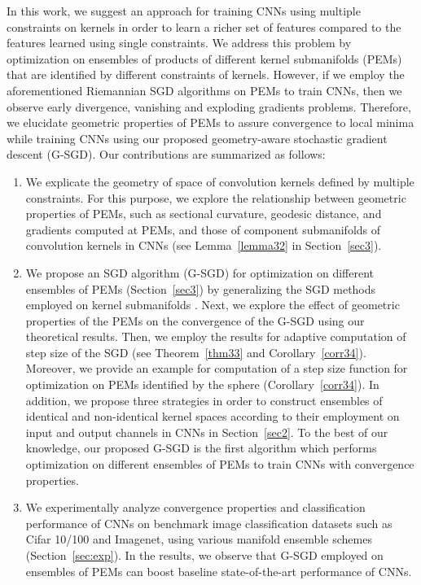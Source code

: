 \documentclass[10pt,journal,compsoc]{IEEEtran}
\theoremstyle{definition}
\theoremstyle{definition}
\theoremstyle{remark}
\theoremstyle{remark}
\theoremstyle{remark}
\begin{document}
	 
	

In this work, we suggest an approach for training CNNs using multiple constraints on kernels in order to learn a richer set of features compared to the features learned using single constraints. We address this problem by optimization on ensembles of products of different kernel submanifolds (PEMs) that are identified by different constraints of kernels. However, if we employ the aforementioned Riemannian SGD algorithms \cite{sgdman,RBN,oo16} on PEMs to train CNNs, then we observe early divergence, vanishing and exploding gradients problems. Therefore, we elucidate geometric properties of PEMs to assure convergence to local minima while training CNNs using our proposed geometry-aware stochastic gradient descent (G-SGD). Our contributions are summarized as follows:
\begin{enumerate}

\item We explicate the geometry of space of convolution kernels defined by multiple constraints. For this purpose, we explore the relationship between geometric properties of PEMs, such as sectional curvature, geodesic distance, and gradients computed at PEMs, and those of component submanifolds of convolution kernels in CNNs (see Lemma~\ref{lemma32} in Section~\ref{sec3}).  

\item We propose an SGD algorithm (G-SGD) for optimization on different ensembles of PEMs (Section~\ref{sec3}) by generalizing the SGD methods employed on kernel submanifolds \cite{haaai,huang162,oo16}. Next, we explore the effect of geometric properties of the PEMs on the convergence of the G-SGD using our theoretical results. Then, we employ the results for adaptive computation of step size of the SGD (see Theorem~\ref{thm33} and Corollary~\ref{corr34}). Moreover, we provide an example for computation of a step size function for optimization on PEMs identified by the sphere (Corollary~\ref{corr34}). In addition, we propose three strategies in order to construct ensembles of identical and non-identical kernel spaces according to their employment on input and output channels in CNNs in Section~\ref{sec2}. To the best of our knowledge, our proposed G-SGD is the first algorithm which performs optimization on different ensembles of PEMs to train CNNs with convergence properties.


\item We experimentally analyze convergence properties and classification performance of CNNs on benchmark image classification datasets such as Cifar 10/100 and Imagenet, using various manifold ensemble schemes (Section~\ref{sec:exp}). In the results, we observe that G-SGD employed on ensembles of PEMs can boost baseline state-of-the-art performance of CNNs.  
\end{enumerate}
\end{document}
